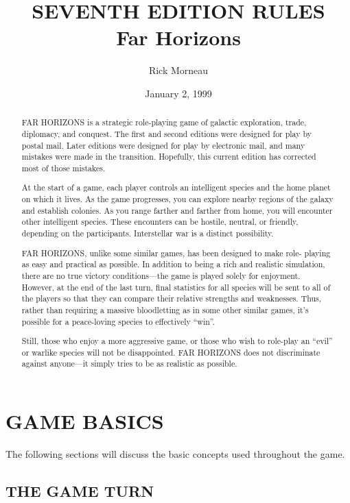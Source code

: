 \documentclass[10pt,titlepage]{article}
\title{
{\small\MakeUppercase{Seventh Edition Rules}} \\ 
{\Huge Far Horizons}
}
\author{Rick Morneau}
\date{January 2, 1999}
\begin{document}
\maketitle
\begin{abstract}
FAR HORIZONS is a strategic role-playing game of galactic exploration, trade,
diplomacy, and conquest.  The first and second editions were designed for play
by postal mail.  Later editions were designed for play by electronic mail, and
many mistakes were made in the transition.  Hopefully, this current edition has
corrected most of those mistakes.

At the start of a game, each player controls an intelligent species and the
home planet on which it lives.  As the game progresses, you can explore nearby
regions of the galaxy and establish colonies.  As you range farther and farther
from home, you will encounter other intelligent species.  These encounters can
be hostile, neutral, or friendly, depending on the participants.  Interstellar
war is a distinct possibility.

FAR HORIZONS, unlike some similar games, has been designed to make role-
playing as easy and practical as possible.  In addition to being a rich and
realistic simulation, there are no true victory conditions---the game is played
solely for enjoyment.  However, at the end of the last turn, final statistics
for all species will be sent to all of the players so that they can compare
their relative strengths and weaknesses.  Thus, rather than requiring a massive
bloodletting as in some other similar games, it's possible for a peace-loving
species to effectively ``win''.

Still, those who enjoy a more aggressive game, or those who wish to role-play
an ``evil'' or warlike species will not be disappointed.  FAR HORIZONS does not
discriminate against anyone---it simply tries to be as realistic as possible.
\end{abstract}
\newpage
\tableofcontents
\newpage

\section{GAME BASICS}

The following sections will discuss the basic concepts used throughout the
game.


\subsection{THE GAME TURN}
\end{document}
